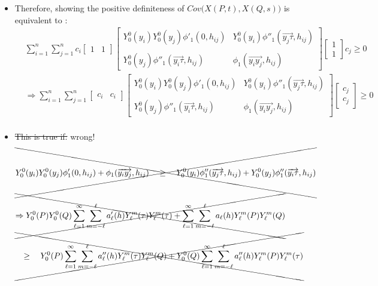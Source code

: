 \documentclass[11pt]{article}
\begin{document}
\begin{itemize}
\item
Therefore, showing the positive definiteness of $Cov\biggl(X(P,t), X(Q,s)\biggl)$ is equivalent to :\\
\begin{align*}
&\sum_{i=1}^n \sum_{j=1}^n 
c_i\begin{bmatrix}
1 & 1
\end{bmatrix}
\begin{bmatrix}
Y_0^0(y_i) Y_0^0(y_j) \phi'_1(0,h_{ij}) & Y_0^0(y_i) \phi''_1(\overrightarrow{y_j\tau},h_{ij}) \\\\
Y_0^0(y_j) \phi''_1(\overrightarrow{y_i\tau},h_{ij}) & \phi_1(\overrightarrow{y_i y_j},h_{ij})
\end{bmatrix}
\begin{bmatrix}
1\\
1
\end{bmatrix}
c_j
\ge 0\\
&\Rightarrow
\sum_{i=1}^n \sum_{j=1}^n 
\begin{bmatrix}
c_i & c_i
\end{bmatrix}
\begin{bmatrix}
Y_0^0(y_i) Y_0^0(y_j) \phi'_1(0,h_{ij}) & Y_0^0(y_i) \phi''_1(\overrightarrow{y_j\tau},h_{ij}) \\\\
Y_0^0(y_j) \phi''_1(\overrightarrow{y_i\tau},h_{ij}) & \phi_1(\overrightarrow{y_i y_j},h_{ij})
\end{bmatrix}
\begin{bmatrix}
c_j\\
c_j
\end{bmatrix}
\ge 0\\
\end{align*}

\item \sout{This is true if:} {\color{red} wrong!}\\
\begin{align*}
&\xcancel{Y_0^0(y_i) Y_0^0(y_j) \phi'_1(0,h_{ij}) + \phi_1(\overrightarrow{y_i y_j},h_{ij}) \quad \ge \quad Y_0^0(y_i) \phi''_1(\overrightarrow{y_j\tau},h_{ij}) + Y_0^0(y_j) \phi''_1(\overrightarrow{y_i\tau},h_{ij})}\\
\\
&\xcancel{\Rightarrow Y_{0}^{0}(P) Y_{0}^{0}(Q) \sum_{\ell=1}^{\infty} \sum_{m=-\ell}^{\ell} a'_\ell(h) Y_{\ell}^{m}(\tau) Y_{\ell}^{m}(\tau) + \sum_{\ell=1}^{\infty} \sum_{m=-\ell}^{\ell}  a_{\ell}(h) Y_{\ell}^{m}(P) Y_{\ell}^{m}(Q)}\\
&\xcancel{\quad \ge \quad Y_{0}^{0}(P) \sum_{\ell=1}^{\infty} \sum_{m=-\ell}^{\ell}  a''_{\ell}(h) Y_{\ell}^{m}(\tau) Y_{\ell}^{m}(Q) + Y_{0}^{0}(Q) \sum_{\ell=1}^{\infty} \sum_{m=-\ell}^{\ell}  a''_{\ell}(h) Y_{\ell}^{m}(P) Y_{\ell}^{m}(\tau)}\\
\end{align*}



\end{itemize}
\end{document}
